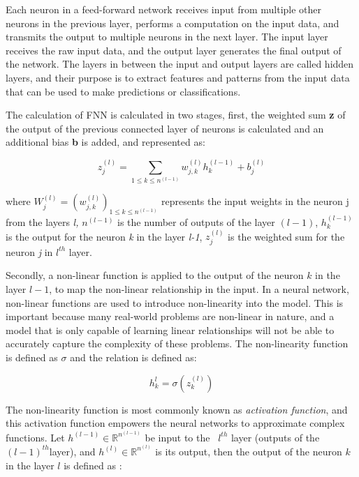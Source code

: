  Each neuron in a feed-forward network receives input from multiple other neurons in the previous layer, performs a computation on the input data, and transmits the output to multiple neurons in the next layer. The input layer receives the raw input data, and the output layer generates the final output of the network. The layers in between the input and output layers are called hidden layers, and their purpose is to extract features and patterns from the input data that can be used to make predictions or classifications.

 The calculation of FNN is calculated in two stages, first, the weighted sum \textbf{z} of the output of the previous connected layer of neurons is calculated and an additional bias \textbf{b} is added, and represented as:

\begin{equation}
z_{j}^{(l)}=\sum_{1\leq k\leq n^{(l-1)}}w_{j,k}^{(l)}h_{k}^{(l-1)}+b_{j}^{(l)}
\label{eq:wb}
\end{equation}

where \textbf{$W_{j}^{(l)}=(w_{j,k}^{(l)})_{1\leq k\leq n^{(l-1)}}$} represents the input weights in the neuron j from the layers \textit{l,} $n^{(l-1)}$ is the number of outputs of the layer $(l-1)$, $h_{k}^{(l-1)}$ is the output for the neuron \textit{k} in the layer \textit{l-1}, $z_{j}^{(l)}$ is the weighted sum for the neuron \textit{j} in $l^{th}$ layer.

Secondly, a non-linear function is applied to the output of the neuron $k$ in the layer $l-1$, to map the non-linear relationship in the input. In a neural network, non-linear functions are used to introduce non-linearity into the model. This is important because many real-world problems are non-linear in nature, and a model that is only capable of learning linear relationships will not be able to accurately capture the complexity of these problems. The non-linearity function is defined as $\sigma$ and the relation is defined as:


\begin{equation}
h_{k}^{l}=\sigma{(z_{k}^{(l)})}
\label{eq:wb2-1}
\end{equation}

The non-linearity function is most commonly known as \textit{activation function}, and this activation function empowers the neural networks to approximate complex functions. Let $h^{(l-1)}\in\mathbb{R}^{n^{(l-1)}}$ be input to the~ $l^{th}$  layer (outputs of the $(l-1)^{th}$layer), and $h^{(l)}\in\mathbb{R}^{n^{(l)}}$ is its output, then the output of the neuron $k$ in the layer $l$ is defined as :

